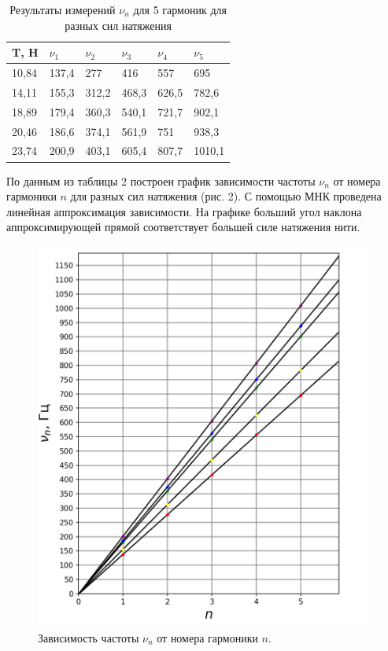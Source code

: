 \documentclass[a4paper,12pt]{article}
\begin{document}
 \begin{table}[!ht]
    \caption{Результаты измерений $\nu_n$ для 5 гармоник для разных сил натяжения}
    \centering
    \begin{tabular}{|l|l|l|l|l|l|}
    \hline
        T, H & $\nu_1$ & $\nu_2$ & $\nu_3$ & $\nu_4$ & $\nu_5$ \\ \hline
        10,84 & 137,4 & 277 & 416 & 557 & 695 \\ \hline
        14,11 & 155,3 & 312,2 & 468,3 & 626,5 & 782,6 \\ \hline
        18,89 & 179,4 & 360,3 & 540,1 & 721,7 & 902,1 \\ \hline
        20,46 & 186,6 & 374,1 & 561,9 & 751 & 938,3 \\ \hline
        23,74 & 200,9 & 403,1 & 605,4 & 807,7 & 1010,1 \\ \hline
    \end{tabular}
\end{table}
По данным из таблицы 2 построен график зависимости частоты $\nu_n$ от номера гармоники $n$ для разных сил натяжения (рис. 2). С помощью МНК проведена линейная аппроксимация зависимости. На графике больший угол наклона аппроксимирующей прямой соответствует большей силе натяжения нити.

\begin{figure}[h]
    \centering
    \includegraphics[scale=0.6]{Screenshot 2023-10-11 065731.png}
    \caption{Зависимость частоты $\nu_n$ от номера гармоники $n$.}
    \label{fig:enter-label}
\end{figure}
\end{document}
